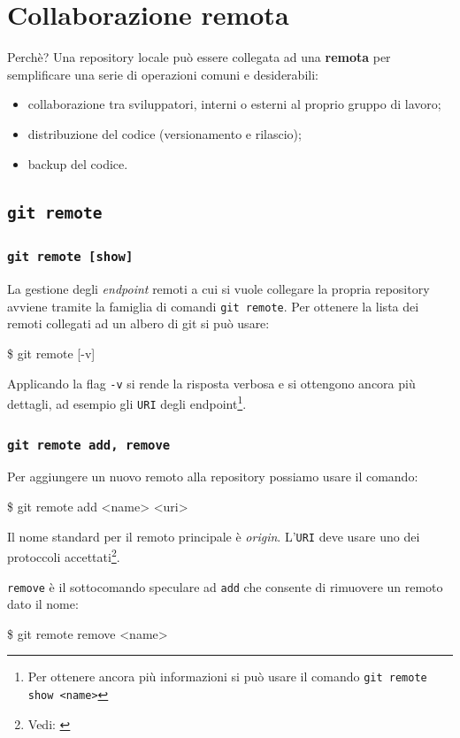 \documentclass{beamer}
\begin{document}
\section{Collaborazione remota}
\begin{frame}{Perch\`e?}
  Una repository locale pu\`o essere collegata ad una \textbf{remota} per
  semplificare una serie di operazioni comuni e desiderabili:
  \begin{itemize}
    \item<1-> collaborazione tra sviluppatori, interni o esterni al proprio gruppo di lavoro;
    \item<2-> distribuzione del codice (versionamento e rilascio);
    \item<3-> backup del codice.
  \end{itemize}
\end{frame}

\subsection{\texttt{git remote}}
\begin{frame}
  \frametitle{\texttt{git remote [show]}}
  La gestione degli \emph{endpoint} remoti a cui si vuole collegare la propria
  repository avviene tramite la famiglia di comandi \texttt{git remote}.
  Per ottenere la lista dei remoti collegati ad un albero di git si pu\`o usare:
  \begin{semiverbatim}
  \$ git remote [-v]
  \end{semiverbatim}
  Applicando la flag \texttt{-v} si rende la risposta verbosa e si ottengono
  ancora pi\`u dettagli, ad esempio gli \texttt{URI} degli endpoint\footnote{
    Per ottenere ancora pi\`u informazioni si pu\`o usare il comando \texttt{git remote show <name>}
  }.
\end{frame}

\begin{frame}
  \frametitle{\texttt{git remote add, remove}}
  Per aggiungere un nuovo remoto alla repository possiamo usare il comando:
  \begin{semiverbatim}
  \$ git remote add <name> <uri>
  \end{semiverbatim}
  Il nome standard per il remoto principale \`e \emph{origin}. L'\texttt{URI}
  deve usare uno dei protoccoli accettati\footnote{Vedi:
    \href{https://stackoverflow.com/a/51112344}{}}.

    \pause
  \texttt{remove} \`e il sottocomando speculare ad \texttt{add} che consente di
  rimuovere un remoto dato il nome:
  \begin{semiverbatim}
  \$ git remote remove <name>
  \end{semiverbatim}
\end{frame}
\end{document}
